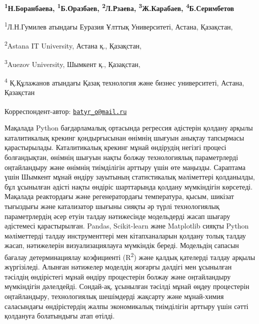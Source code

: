 
\begin{articleheader}

{\bfseries \textsuperscript{1}Н.Боранбаева,
\textsuperscript{1}Б.Оразбаев\textsuperscript{\envelope },
\textsuperscript{2}Л.Рзаева, \textsuperscript{3}Ж.Карабаев,
\textsuperscript{4}Б.Серимбетов}
\end{articleheader}

\begin{affiliation}
\textsuperscript{1}Л.Н.Гумилев атындағы Еуразия Ұлттық Университеті,
Астана, Қазақстан,

\textsuperscript{2}Astana IT University, Астана қ., Қазақстан,

\textsuperscript{3}Auezov University, Шымкент қ., Қазақстан,

\textsuperscript{4} Қ.Құлажанов атындағы Қазақ технология және бизнес
университеті, Астана, Қазақстан

\raggedright {\bfseries \textsuperscript{\envelope }}Корреспондент-автор: \href{mailto:batyr_o@mail.ru}{\nolinkurl{batyr\_o@mail.ru}}
\end{affiliation}

Мақалада Python бағдарламалық ортасында регрессия әдістерін қолдану
арқылы каталитикалық крекинг қондырғысынан өнімнің шығуын анықтау
тапсырмасы қарастырылады. Каталитикалық крекинг мұнай өндірудің негізгі
процесі болғандықтан, өнімнің шығуын нақты болжау технологиялық
параметрлерді оңтайландыру және өнімнің тиімділігін арттыру үшін өте
маңызды. Сараптама үшін Шымкент мұнай өндіру зауытының статистикалық
мәліметтері қолданылды, бұл ұсынылған әдісті нақты өндіріс шарттарында
қолдану мүмкіндігін көрсетеді. Мақалада реактордағы және регенератордағы
температура, қысым, шикізат тығыздығы және катализатор шығыны сияқты әр
түрлі технологиялық параметрлердің әсер етуін талдау нәтижесінде
модельдерді жасап шығару әдістемесі қарастырылған. Pandas, Scikit-learn
және Matplotlib сияқты Python мәліметтерді талдау инструменттері мен
кітапханаларын қолдану толық талдау жасап, нәтижелерін визуализациялауға
мүмкіндік береді. Модельдің сапасын бағалау детерминациялау коэфициенті
(R\textsuperscript{2}) және қалдық қателерді талдау арқылы жүргізіледі.
Алынған нәтижелер моделдің жоғарғы дәлдігі мен ұсынылған тәсілдің
өндірістегі мұнай өндіру процестерін болжау және оңтайландыру
мүмкіндігін дәлелдейді. Сондай-ақ, ұсынылған тәсілді мұнай өңдеу
процестерін оңтайландыру, технологиялық шешімдерді жақсарту және
мұнай-химия саласындағы өндірістердің жалпы экономикалық тиімділігін
арттыру үшін сәтті қолдануға болатындығы атап өтілді.

